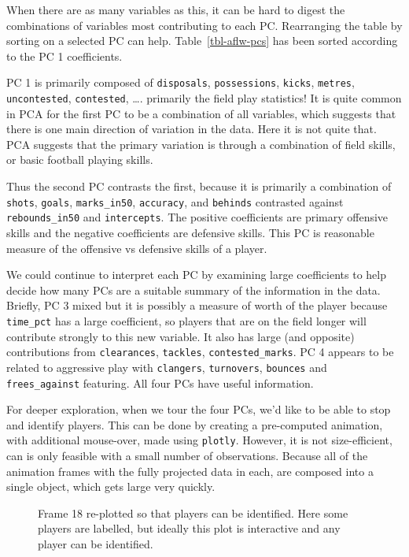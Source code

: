 \documentclass[
  letterpaper,
]{krantz}
\begin{document}
When there are as many variables as this, it can be hard to digest the
combinations of variables most contributing to each PC. Rearranging the
table by sorting on a selected PC can help. Table~\ref{tbl-aflw-pcs} has
been sorted according to the PC 1 coefficients.

PC 1 is primarily composed of \texttt{disposals}, \texttt{possessions},
\texttt{kicks}, \texttt{metres}, \texttt{uncontested},
\texttt{contested}, \ldots. primarily the field play statistics! It is
quite common in PCA for the first PC to be a combination of all
variables, which suggests that there is one main direction of variation
in the data. Here it is not quite that. PCA suggests that the primary
variation is through a combination of field skills, or basic football
playing skills.

Thus the second PC contrasts the first, because it is primarily a
combination of \texttt{shots}, \texttt{goals}, \texttt{marks\_in50},
\texttt{accuracy}, and \texttt{behinds} contrasted against
\texttt{rebounds\_in50} and \texttt{intercepts}. The positive
coefficients are primary offensive skills and the negative coefficients
are defensive skills. This PC is reasonable measure of the offensive vs
defensive skills of a player.


We could continue to interpret each PC by examining large coefficients
to help decide how many PCs are a suitable summary of the information in
the data. Briefly, PC 3 mixed but it is possibly a measure of worth of
the player because \texttt{time\_pct} has a large coefficient, so
players that are on the field longer will contribute strongly to this
new variable. It also has large (and opposite) contributions from
\texttt{clearances}, \texttt{tackles}, \texttt{contested\_marks}. PC 4
appears to be related to aggressive play with \texttt{clangers},
\texttt{turnovers}, \texttt{bounces} and \texttt{frees\_against}
featuring. All four PCs have useful information.

For deeper exploration, when we tour the four PCs, we'd like to be able
to stop and identify players. This can be done by creating a
pre-computed animation, with additional mouse-over, made using
\texttt{plotly}. However, it is not size-efficient, can is only feasible
with a small number of observations. Because all of the animation frames
with the fully projected data in each, are composed into a single
object, which gets large very quickly.

\begin{figure}


\caption{\label{fig-aflw-pcaplots-pdf}Frame 18 re-plotted so that
players can be identified. Here some players are labelled, but ideally
this plot is interactive and any player can be identified.
}

\end{figure}%
\end{document}
